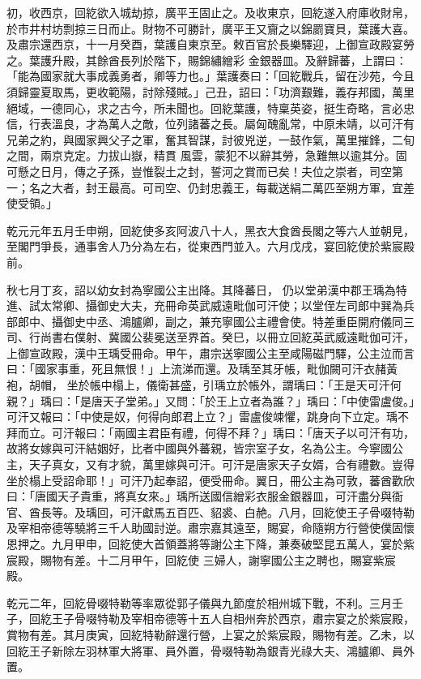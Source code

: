 \begin{pinyinscope}
 初，收西京，回紇欲入城劫掠，廣平王固止之。及收東京，回紇遂入府庫收財帛，於市井村坊剽掠三日而止。財物不可勝計，廣平王又齎之以錦罽寶貝，葉護大喜。及肅宗還西京，十一月癸酉，葉護自東京至。敕百官於長樂驛迎，上御宣政殿宴勞之。葉護升殿，其餘酋長列於階下，賜錦繡繒彩
 金銀器皿。及辭歸蕃，上謂曰：「能為國家就大事成義勇者，卿等力也。」葉護奏曰：「回紇戰兵，留在沙苑，今且須歸靈夏取馬，更收範陽，討除殘賊。」己丑，詔曰：「功濟艱難，義存邦國，萬里絕域，一德同心，求之古今，所未聞也。回紇葉護，特稟英姿，挺生奇略，言必忠信，行表溫良，才為萬人之敵，位列諸蕃之長。屬匈醜亂常，中原未靖，以可汗有兄弟之約，與國家興父子之軍，奮其智謀，討彼兇逆，一鼓作氣，萬里摧鋒，二旬之間，兩京克定。力拔山嶽，精貫
 風雲，蒙犯不以辭其勞，急難無以逾其分。固可懸之日月，傳之子孫，豈惟裂土之封，誓河之賞而已矣！夫位之崇者，司空第一；名之大者，封王最高。可司空、仍封忠義王，每載送絹二萬匹至朔方軍，宜差使受領。」



 乾元元年五月壬申朔，回紇使多亥阿波八十人，黑衣大食酋長閣之等六人並朝見，至閣門爭長，通事舍人乃分為左右，從東西門並入。六月戊戌，宴回紇使於紫宸殿前。



 秋七月丁亥，詔以幼女封為寧國公主出降。其降蕃日，
 仍以堂弟漢中郡王瑀為特進、試太常卿、攝御史大夫，充冊命英武威遠毗伽可汗使；以堂侄左司郎中巽為兵部郎中、攝御史中丞、鴻臚卿，副之，兼充寧國公主禮會使。特差重臣開府儀同三司、行尚書右僕射、冀國公裴冕送至界首。癸巳，以冊立回紇英武威遠毗伽可汗，上御宣政殿，漢中王瑀受冊命。甲午，肅宗送寧國公主至咸陽磁門驛，公主泣而言曰：「國家事重，死且無恨！」上流涕而還。及瑀至其牙帳，毗伽闕可汗衣赭黃袍，胡帽，
 坐於帳中榻上，儀衛甚盛，引瑀立於帳外，謂瑀曰：「王是天可汗何親？」瑀曰：「是唐天子堂弟。」又問：「於王上立者為誰？」瑀曰：「中使雷盧俊。」可汗又報曰：「中使是奴，何得向郎君上立？」雷盧俊竦懼，跳身向下立定。瑀不拜而立。可汗報曰：「兩國主君臣有禮，何得不拜？」瑀曰：「唐天子以可汗有功，故將女嫁與可汗結姻好，比者中國與外蕃親，皆宗室子女，名為公主。今寧國公主，天子真女，又有才貌，萬里嫁與可汗。可汗是唐家天子女婿，合有禮數。豈得
 坐於榻上受詔命耶！」可汗乃起奉詔，便受冊命。翼日，冊公主為可敦，蕃酋歡欣曰：「唐國天子貴重，將真女來。」瑀所送國信繒彩衣服金銀器皿，可汗盡分與衙官、酋長等。及瑀回，可汗獻馬五百匹、貂裘、白赩。八月，回紇使王子骨啜特勒及宰相帝德等驍將三千人助國討逆。肅宗嘉其遠至，賜宴，命隨朔方行營使僕固懷恩押之。九月甲申，回紇使大首領蓋將等謝公主下降，兼奏破堅昆五萬人，宴於紫宸殿，賜物有差。十二月甲午，回紇使
 三婦人，謝寧國公主之聘也，賜宴紫宸殿。



 乾元二年，回紇骨啜特勒等率眾從郭子儀與九節度於相州城下戰，不利。三月壬子，回紇王子骨啜特勒及宰相帝德等十五人自相州奔於西京，肅宗宴之於紫宸殿，賞物有差。其月庚寅，回紇特勒辭還行營，上宴之於紫宸殿，賜物有差。乙未，以回紇王子新除左羽林軍大將軍、員外置，骨啜特勒為銀青光祿大夫、鴻臚卿、員外置。




\end{pinyinscope}
